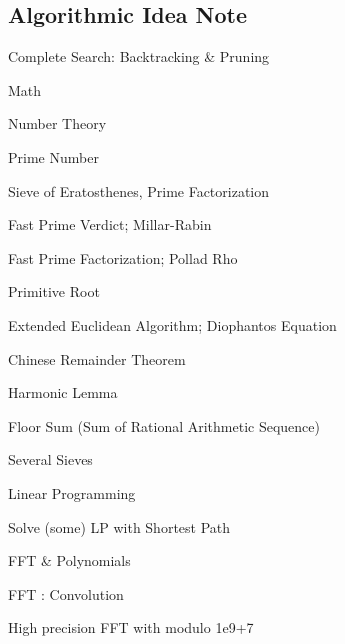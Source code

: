 \documentclass[landscape, 8pt, a4paper, oneside]{extarticle}
\begin{document}
\begin{multicols}{3}

\section{Algorithmic Idea Note}

\begin{tcolorbox}[breakable, enhanced, sharp corners, colback=white, colframe=black, boxrule=1pt, left=0pt]

\begin{IdeaNote}
\item Complete Search: Backtracking \& Pruning

\item Math
    \begin{IdeaNote}
    \item Number Theory
        \begin{IdeaNote}
        \item Prime Number
            \begin{IdeaNote}
            \item Sieve of Eratosthenes, Prime Factorization
            \item Fast Prime Verdict; Millar-Rabin
            \item Fast Prime Factorization; Pollad Rho
            \item Primitive Root
            \end{IdeaNote}
        \item Extended Euclidean Algorithm; Diophantos Equation
        \item Chinese Remainder Theorem
        \item Harmonic Lemma
        \item Floor Sum (Sum of Rational Arithmetic Sequence)
        \item Several Sieves
        \end{IdeaNote}
    \item Linear Programming
        \begin{IdeaNote}
        \item Solve (some) LP with Shortest Path
        \end{IdeaNote}
    \item FFT \& Polynomials
        \begin{IdeaNote}
        \item FFT : Convolution
            \begin{IdeaNote}
            \item High precision FFT with modulo 1e9+7

\end{IdeaNote}
\end{IdeaNote}
\end{IdeaNote}
\end{IdeaNote}
\end{tcolorbox}
\end{multicols}
\end{document}
